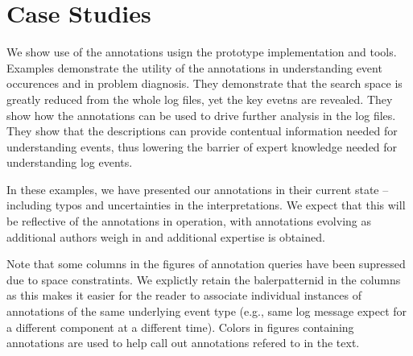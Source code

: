 \section{Case Studies}
\label{s:examples}

We show use of the annotations usign the prototype implementation and tools. Examples
demonstrate the utility of the annotations in understanding
event occurences and in problem diagnosis. They demonstrate that
the search space is greatly reduced from the whole log files, yet
the key evetns are revealed. They show how the annotations can be
used to drive further analysis in the log files. They show that
the descriptions can provide contentual information needed
for understanding events, thus lowering the barrier of
expert knowledge needed for understanding log events.

In these examples, we have presented our annotations in their current
state -- including typos and uncertainties in the interpretations.
We expect that this will be reflective of the annotations
in operation, with annotations evolving as additional authors
weigh in and additional expertise is obtained.

Note that some columns in the figures of annotation queries have been supressed due to space
constratints. We explictly retain the balerpatternid in the columns as this makes it easier
for the reader to associate individual instances of annotations of the same underlying event type
(e.g., same log message expect for a different component at a different time).
Colors in figures containing annotations are used to help call out annotations
refered to in the text.






